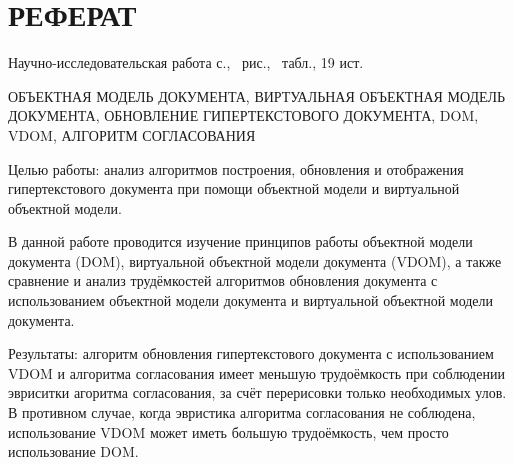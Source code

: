 \section*{РЕФЕРАТ}

Научно-исследовательская работа \pageref{LastPage} с., \totalfigures\ рис., \totaltables\ табл., 19 ист.

ОБЪЕКТНАЯ МОДЕЛЬ ДОКУМЕНТА, ВИРТУАЛЬНАЯ ОБЪЕКТНАЯ МОДЕЛЬ ДОКУМЕНТА, ОБНОВЛЕНИЕ ГИПЕРТЕКСТОВОГО ДОКУМЕНТА, DOM, VDOM, АЛГОРИТМ СОГЛАСОВАНИЯ

Целью работы: анализ алгоритмов построения, обновления и отображения гипертекстового документа при помощи объектной модели и виртуальной объектной модели.

В данной работе проводится изучение принципов работы объектной модели документа (DOM), виртуальной объектной модели документа (VDOM), а также сравнение и анализ трудёмкостей алгоритмов обновления документа с использованием объектной модели документа и виртуальной объектной модели документа.

Результаты: алгоритм обновления гипертекстового документа с использованием VDOM и алгоритма согласования имеет меньшую трудоёмкость при соблюдении эвриситки агоритма согласования, за счёт перерисовки только необходимых улов.
В противном случае, когда эвристика алгоритма согласования не соблюдена, использование VDOM может иметь большую трудоёмкость, чем просто использование DOM.


\pagebreak